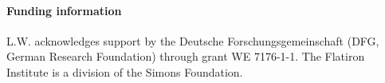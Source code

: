 \documentclass{SciPost}
\begin{document}
\paragraph{Funding information}
L.W. acknowledges support by the Deutsche Forschungsgemeinschaft (DFG, German Research Foundation) through grant WE 7176-1-1.
The Flatiron Institute is a division of the Simons Foundation.
\begin{appendix}
\end{appendix}



\end{document}
